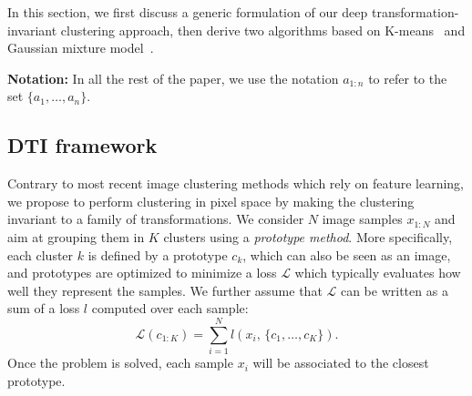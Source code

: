 \documentclass{article}
\begin{document}
In this section, we first discuss a generic formulation of our deep transformation-invariant 
clustering approach, then derive two algorithms based on 
K-means~\cite{macqueenMethodsClassificationAnalysis1967} and Gaussian mixture 
model~\cite{dempsterMaximumLikelihoodIncomplete1977}.

\vspace{-0.3em}
{\bf Notation:} In all the rest of the paper, we use the notation $a_{1:n}$ to refer to the 
set $\{a_1, \ldots, a_n\}$.

\subsection{DTI framework}\label{sec:dti}

Contrary to most recent image clustering methods which rely on feature learning, we propose 
to perform clustering in pixel space by making the clustering invariant to a family of 
transformations. We consider $N$ image samples $x_{1:N}$ and aim at grouping them in $K$ 
clusters using a \textit{prototype method}. More specifically, each cluster $k$ is defined by 
a prototype $c_k$, which can also be seen as an image, and prototypes are optimized to 
minimize a loss $\mathcal{L}$ which typically evaluates how well they represent the samples.  
We further assume that $\mathcal{L}$ can be written as a sum of a loss $l$ computed over each 
sample:\begin{equation}\label{eq:basic}
  \mathcal{L}(c_{1:K})=\sum_{i=1}^N l(x_i,\,\{c_{1}, \ldots,c_K\}).
\end{equation}
Once the problem is solved, each sample $x_i$ will be associated to the closest prototype.
\end{document}
